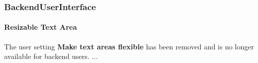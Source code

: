 %

\begin{frame}[fragile]
	\frametitle{BackendUserInterface}
	\framesubtitle{Resizable Text Area}

	The user setting \textbf{Make text areas flexible} has been removed and is no longer available for backend users.
	\newline
	...

\end{frame}

